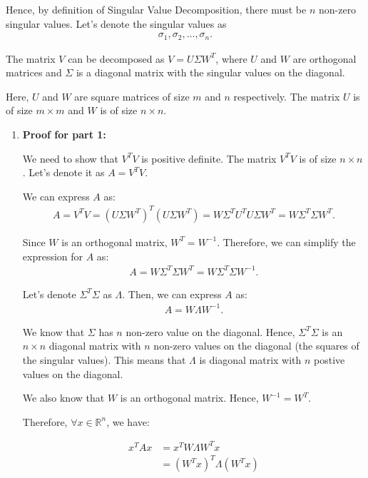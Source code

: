 \documentclass[11pt,onecolumn]{article}
\newcommand{\R}{\mathbb{R}}
\begin{document}
Hence, by definition of Singular Value Decomposition, there must be $n$ non-zero singular values. Let's denote the singular values as 
\begin{align*}    
\sigma_1, \sigma_2, \ldots, \sigma_n.
\end{align*}

The matrix $V$ can be decomposed as $V = U\Sigma W^T$, where $U$ and $W$ are orthogonal matrices and $\Sigma$ is a diagonal matrix with the singular values on the diagonal.

Here, $U$ and $W$ are square matrices of size $m$ and $n$ respectively. The matrix $U$ is of size $m \times m$ and $W$ is of size $n \times n$.

\begin{enumerate}
    \item \textbf{Proof for part 1:}
    
    We need to show that $V^TV$ is positive definite. The matrix $V^TV$ is of size $n \times n$. Let's denote it as $A = V^TV$.
    
    We can express $A$ as:
    \begin{align*}
        A = V^TV = (U\Sigma W^T)^T(U\Sigma W^T) = W\Sigma^T U^T U\Sigma W^T = W\Sigma^T \Sigma W^T.
    \end{align*}
    
    Since $W$ is an orthogonal matrix, $W^T = W^{-1}$. Therefore, we can simplify the expression for $A$ as:
    \begin{align*}
        A = W\Sigma^T \Sigma W^T = W\Sigma^T \Sigma W^{-1}.
    \end{align*}
    
    Let's denote $\Sigma^T \Sigma$ as $\Lambda$. Then, we can express $A$ as:
    \begin{align*}
        A = W\Lambda W^{-1}.
    \end{align*}
    
    We know that $\Sigma$ has $n$ non-zero value on the diagonal. Hence, $\Sigma^T \Sigma$ is an $n \times n$ diagonal matrix with $n$ non-zero values on the diagonal (the squares of the singular values). This means that $\Lambda$ is diagonal matrix with $n$ postive values on the diagonal.

    We also know that $W$ is an orthogonal matrix. Hence, $W^{-1} = W^T$.

    Therefore, $\forall x \in \R^n$, we have:

    \begin{align*}
        x^TAx &= x^T W\Lambda W^T x \\
        &= (W^T x)^T \Lambda (W^T x) \\
    \end{align*}


\end{enumerate}
\end{document}
